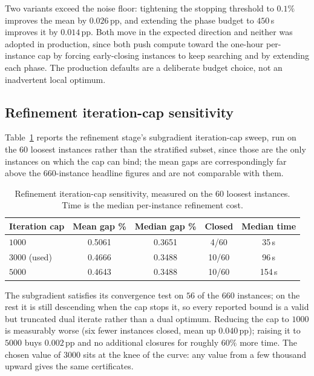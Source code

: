 \documentclass[11pt]{article}
\begin{document}
Two variants exceed the noise floor: tightening the stopping threshold to
$0.1\%$ improves the mean by $0.026$\,pp, and extending the phase budget to
$450$\,s improves it by $0.014$\,pp. Both move in the expected direction and
neither was adopted in production, since both push compute toward the
one-hour per-instance cap by forcing early-closing instances to keep searching
and by extending each phase. The production defaults are a deliberate budget
choice, not an inadvertent local optimum.

\subsection{Refinement iteration-cap sensitivity}

Table~\ref{tab:refinesens} reports the refinement stage's subgradient
iteration-cap sweep, run on the $60$ loosest instances rather than the
stratified subset, since those are the only instances on which the cap can
bind; the mean gaps are correspondingly far above the $660$-instance headline
figures and are not comparable with them.

\begin{table}[h]
\centering
\caption{Refinement iteration-cap sensitivity, measured on the $60$ loosest
instances. Time is the median per-instance refinement cost.}
\label{tab:refinesens}
\begin{tabular}{lcccc}
\toprule
Iteration cap & Mean gap \% & Median gap \% & Closed & Median time \\
\midrule
$1000$            & 0.5061 & 0.3651 & 4/60  & 35\,s \\
$3000$ (used)     & 0.4666 & 0.3488 & 10/60 & 96\,s \\
$5000$            & 0.4643 & 0.3488 & 10/60 & 154\,s \\
\bottomrule
\end{tabular}
\end{table}

The subgradient satisfies its convergence test on $56$ of the $660$ instances;
on the rest it is still descending when the cap stops it, so every reported
bound is a valid but truncated dual iterate rather than a dual optimum.
Reducing the cap to $1000$ is measurably worse (six fewer instances closed, mean
up $0.040$\,pp); raising it to $5000$ buys $0.002$\,pp and no additional
closures for roughly $60\%$ more time. The chosen value of $3000$ sits at the
knee of the curve: any value from a few thousand upward gives the same
certificates.
\end{document}
